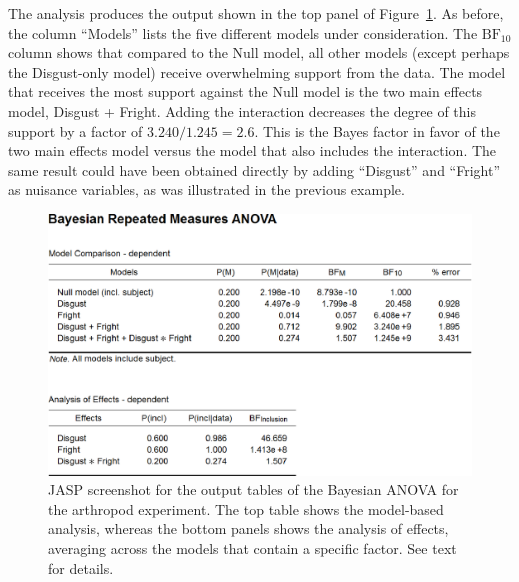 The analysis produces the output shown in the top panel of Figure~\ref{fig:bi2:ArthropodBANOVATable}. As before, the column ``Models'' lists the five different models under consideration. The $\text{BF}_{10}$ column shows that compared to the Null model, all other models (except perhaps the Disgust-only model) receive overwhelming support from the data. The model that receives the most support against the Null model is the two main effects model, Disgust + Fright. Adding the interaction decreases the degree of this support by a factor of $3.240 / 1.245 = 2.6$. This is the Bayes factor in favor of the two main effects model versus the model that also includes the interaction. The same result could have been obtained directly by adding ``Disgust'' and ``Fright'' as nuisance variables, as was illustrated in the previous example.

\begin{figure}[!t]
    \begin{center}
        \includegraphics[width=1\textwidth]{figs/bi2_ArthropodBANOVATable.eps}
        \caption{JASP screenshot for the output tables of the Bayesian ANOVA for the arthropod experiment. The top table shows the model-based analysis, whereas the bottom panels shows the analysis of effects, averaging across the models that contain a specific factor. See text for details.} \label{fig:bi2:ArthropodBANOVATable}
    \end{center}
\end{figure}

